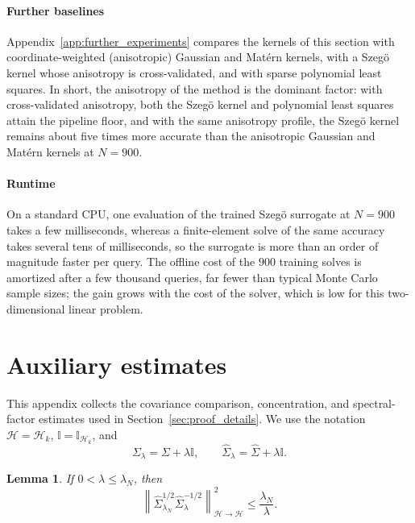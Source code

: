 \documentclass[11pt]{article}
\numberwithin{equation}{section}
\theoremstyle{plain}
\newtheorem{lemma}[theorem]{Lemma}
\theoremstyle{definition}
\theoremstyle{remark}
\newcommand{\Hs}{\mathcal{H}}
\newcommand{\I}{\mathbb{I}}
\newcommand{\norm}[1]{\left\lVert#1\right\rVert}
\begin{document}
\paragraph{Further baselines}
Appendix~\ref{app:further_experiments} compares the kernels of this section with
coordinate-weighted (anisotropic) Gaussian and Matérn kernels, with a Szegö kernel whose
anisotropy is cross-validated, and with sparse polynomial least squares. In short, the
anisotropy of the method is the dominant factor: with cross-validated anisotropy, both the
Szegö kernel and polynomial least squares attain the pipeline floor, and with the same
anisotropy profile, the Szegö kernel remains about five times more accurate than the
anisotropic Gaussian and Matérn kernels at $N=900$.

\paragraph{Runtime}
On a standard CPU, one evaluation of the trained Szegö surrogate at $N=900$
takes a few milliseconds, whereas a finite-element solve of the same accuracy
takes several tens of milliseconds, so the surrogate is more than an order of
magnitude faster per query. The offline cost of the $900$ training solves is
amortized after a few thousand queries, far fewer than typical Monte Carlo
sample sizes; the gain grows with the cost of the solver, which is low for this
two-dimensional linear problem.

\FloatBarrier
\appendix

\section{Auxiliary estimates}
\label{app:auxiliary_estimates}

This appendix collects the covariance comparison, concentration, and
spectral-factor estimates used in Section~\ref{sec:proof_details}. We use the
notation $\Hs=\Hs_k$, $\I=\I_{\Hs_k}$, and
\[
\Sigma_\lambda=\Sigma+\lambda\I,
\qquad
\hat{\Sigma}_\lambda=\hat{\Sigma}+\lambda\I.
\]

\begin{lemma}\label{lem:comp_betw_lambdas}
If $0<\lambda\leq\lambda_N$, then
\begin{equation}
\label{eq:comp_betw_lambdas}
\norm{\hat{\Sigma}_{\lambda_N}^{1/2}
\hat{\Sigma}_{\lambda}^{-1/2}}_{\Hs\to\Hs}^{2}
\leq
\frac{\lambda_N}{\lambda}.
\end{equation}
\end{lemma}
\end{document}
